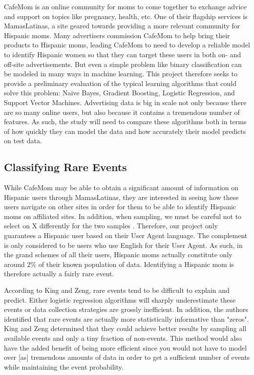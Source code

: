 \documentclass[twoside]{article}
\begin{document}
\begin{multicols}{2}
CafeMom is an online community for moms to come together to exchange advice and support on topics like pregnancy, health, etc. One of their flagship services is MamasLatinas, a site geared towards providing a more relevant community for Hispanic moms. Many advertisers commission CafeMom to help bring their products to Hispanic moms, leading CafeMom to need to develop a reliable model to identify Hispanic women so that they can target these users in both on- and off-site advertisements. But even a simple problem like binary classification can be modeled in many ways in machine learning. This project therefore seeks to provide a preliminary evaluation of the typical learning algorithms that could solve this problem: Naive Bayes, Gradient Boosting, Logistic Regression, and Support Vector Machines. Advertising data is big in scale not only because there are so many online users, but also because it contains a tremendous number of features. As such, the study will need to compare these algorithms both in terms of how quickly they can model the data and how accurately their model predicts on test data.

\subsection{Classifying Rare Events}
While CafeMom may be able to obtain a significant amount of information on Hispanic users through MamasLatinas, they are interested in seeing how these users navigate on other sites in order for them to be able to identify Hispanic moms on affiliated sites. In addition, when sampling, we must be careful not to select on X differently for the two samples \cite{1}. Therefore, our project only guarantees a Hispanic user based on their User Agent language. The complement is only considered to be users who use English for their User Agent. As such, in the grand schemes of all their users, Hispanic moms actually constitute only around 2\% of their known population of data. Identifying a Hispanic mom is therefore actually a fairly rare event.

According to King and Zeng, rare events tend to be difficult to explain and predict\cite{1}. Either logistic regression algorithms will sharply underestimate these events or data collection strategies are grossly inefficient\cite{1}. In addition, the authors identified that rare events are actually more statistically informative than "zeros"\cite{1}. King and Zeng determined that they could achieve better results by sampling all available events and only a tiny fraction of non-events. This method would also have the added benefit of being more efficient since you would not have to model over [as] tremendous amounts of data in order to get a sufficient number of events while maintaining the event probability.


\end{multicols}
\end{document}
